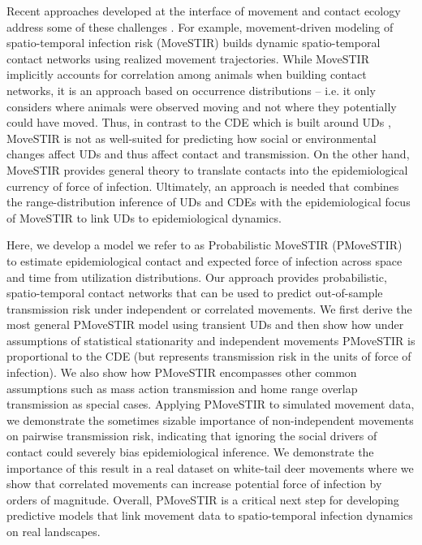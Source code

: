 \documentclass[letterpaper]{article}
\begin{document}
Recent approaches developed at the interface of movement and contact ecology address some of these challenges \citep{Wilber2022,Yang2023}. For example, movement-driven modeling of spatio-temporal infection risk (MoveSTIR) builds dynamic spatio-temporal contact networks using realized movement trajectories. While MoveSTIR implicitly accounts for correlation among animals when building contact networks, it is an approach based on occurrence distributions \citep{Alston2022} -- i.e. it only considers where animals were observed moving and not where they potentially could have moved. Thus, in contrast to the CDE which is built around UDs \citep[a range-distribution method in the terminology of][]{Alston2022}, MoveSTIR is not as well-suited for predicting how social or environmental changes affect UDs and thus affect contact and transmission. On the other hand, MoveSTIR provides general theory to translate contacts into the epidemiological currency of force of infection. Ultimately, an approach is needed that combines the range-distribution inference of UDs and CDEs \citep{Alston2022,Noonan2021} with the epidemiological focus of MoveSTIR to link UDs to epidemiological dynamics. 

Here, we develop a model we refer to as Probabilistic MoveSTIR (PMoveSTIR) to estimate epidemiological contact and expected force of infection across space and time from utilization distributions. 
Our approach provides probabilistic, spatio-temporal contact networks that can be used to predict out-of-sample transmission risk under independent or correlated movements. We first derive the most general PMoveSTIR model using transient UDs and then show how under assumptions of statistical stationarity and independent movements PMoveSTIR is proportional to the CDE (but represents transmission risk in the units of force of infection). We also show how PMoveSTIR encompasses other common assumptions such as mass action transmission and home range overlap transmission as special cases. Applying PMoveSTIR to simulated movement data, we demonstrate the sometimes sizable importance of non-independent movements on pairwise transmission risk, indicating that ignoring the social drivers of contact could severely bias epidemiological inference.  We demonstrate the importance of this result in a real dataset on white-tail deer movements where we show that correlated movements can increase potential force of infection by orders of magnitude.  Overall, PMoveSTIR is a critical next step for developing predictive models that link movement data to spatio-temporal infection dynamics on real landscapes.
\end{document}
